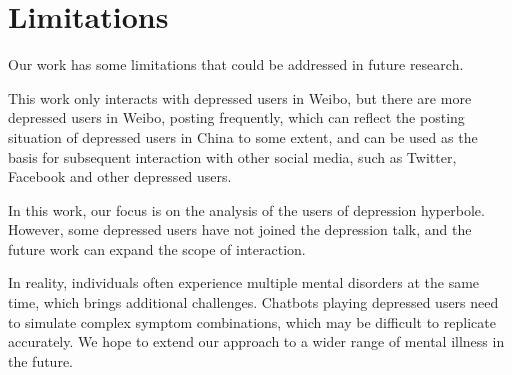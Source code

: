 \section*{Limitations}
\label{sec:limitation}

Our work has some limitations that could be addressed in future research. 

This work only interacts with depressed users in Weibo, but there are more depressed users in Weibo, posting frequently, which can reflect the posting situation of depressed users in China to some extent, and can be used as the basis for subsequent interaction with other social media, such as Twitter, Facebook and other depressed users.

In this work, our focus is on the analysis of the users of depression hyperbole. However, some depressed users have not joined the depression talk, and the future work can expand the scope of interaction.

In reality, individuals often experience multiple mental disorders at the same time, which brings additional challenges. Chatbots playing depressed users need to simulate complex symptom combinations, which may be difficult to replicate accurately. We hope to extend our approach to a wider range of mental illness in the future.

